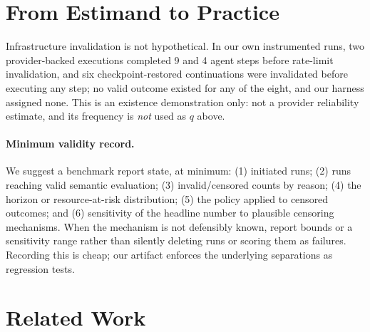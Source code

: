 \documentclass[letterpaper]{article}
\begin{document}
\section{From Estimand to Practice}
\label{sec:practice}

Infrastructure invalidation is not hypothetical. In our own instrumented runs,
two provider-backed executions completed 9 and 4 agent steps before rate-limit
invalidation, and six checkpoint-restored continuations were invalidated before
executing any step; no valid outcome existed for any of the eight, and our
harness assigned none. This is an existence demonstration only: not a provider
reliability estimate, and its frequency is \emph{not} used as $q$ above.

\paragraph{Minimum validity record.} We suggest a benchmark report state, at
minimum: (1) initiated runs; (2) runs reaching valid semantic evaluation;
(3) invalid/censored counts by reason; (4) the horizon or resource-at-risk
distribution; (5) the policy applied to censored outcomes; and (6) sensitivity
of the headline number to plausible censoring mechanisms. When the mechanism is
not defensibly known, report bounds or a sensitivity range rather than silently
deleting runs or scoring them as failures. Recording this is cheap; our artifact
enforces the underlying separations as regression tests.

\section{Related Work}
\end{document}
